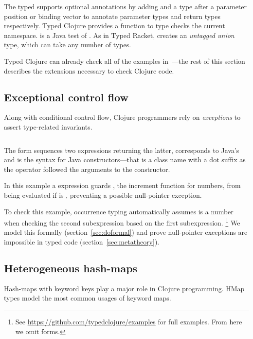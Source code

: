 The typed  supports optional annotations by 
adding
\clj{:-} and a type after a parameter
position
or binding vector 
to annotate parameter types
and return types respectively.
Typed Clojure provides a  function to type checks the current namespace.
 is
a Java  test of .
As in Typed Racket,  creates an \emph{untagged union} type, which can take
any number of types.

Typed Clojure can already check all of the examples in~\citet{TF10}---the 
rest of this section describes the extensions necessary
to check Clojure code.

\subsection{Exceptional control flow}

Along with conditional control flow,
Clojure programmers rely on \emph{exceptions}
to assert type-related invariants.

\begin{exmp}
\inputminted[firstline=13,lastline=15]{clojure}{code/demo/src/demo/do.clj}
\label{example:doexception}
\end{exmp}

The  form sequences two expressions returning the latter,
 corresponds to Java's 
and  is the syntax for Java constructors---that 
is a class name with a dot suffix as the operator followed the arguments to the constructor.

In this example a  expression guards , the increment function for numbers,
from being evaluated if  is , preventing
a possible null-pointer exception.

To check this example,
occurrence typing 
automatically
assumes
 is a number when checking the second  subexpression
based on the first subexpression.
\footnote{See \url{https://github.com/typedclojure/examples}
  for full examples. From here we omit  forms.}
We model this formally (section~\ref{sec:doformal}) and prove
null-pointer exceptions are impossible in typed code (section~\ref{sec:metatheory}).

\subsection{Heterogeneous hash-maps}

Hash-maps with keyword keys play a major role in Clojure programming.
HMap types model the most common usages of keyword maps.

